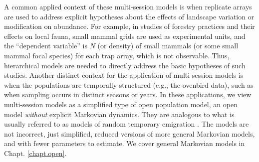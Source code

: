 A common applied context of these multi-session models is when
replicate arrays are used to address explicit hypotheses about the
effects of landscape variation or modification on abundance. For
example, in studies of forestry practices and their effects on local
fauna, small mammal grids are used as experimental units, and the
``dependent variable'' is $N$ (or density) of small mammals (or some
small mammal focal species) for each trap array, which is not
observable.  Thus, hierarchical models are needed to directly address
the basic hypotheses of such studies.  Another distinct context for
the application of multi-session models is when the populations are
temporally structured (e.g., the ovenbird data), such as when sampling
occurs in distinct seasons or years.  In these applications, we view
multi-session models as a simplified type of open population model, an
open model {\it without} explicit Markovian dynamics. They are
analogous to what is usually referred to as models of random temporary
emigration \citep{kendall_etal:1997, chandler_etal:2011}.  The models
are not incorrect, just simplified, reduced versions of more general
Markovian models, and with fewer parameters to estimate.  We cover
general Markovian models in Chapt. \ref{chapt.open}.

